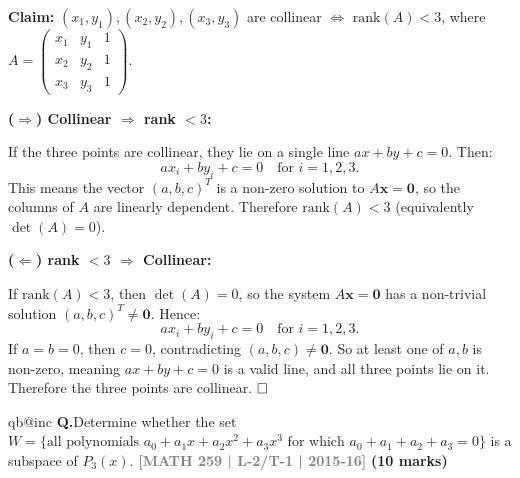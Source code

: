 \documentclass[12pt,a3paper]{article}
\makeatletter
\newcommand{\yr}[1]{\hfill\textcolor{gray}{\small\textbf{[#1]}}}
\newcommand{\mk}[1]{\textcolor{orange!70!black}{\small\textbf{(#1 marks)}}}
\newcounter{qnum}
\newcommand{\Q}[1]{%
  \csname qb@inc\endcsname
  \needspace{4\baselineskip}
  \refstepcounter{qnum}
  \vspace{6pt}
  \noindent\textbf{Q\theqnum.}\enspace #1\par
}
\makeatother
\begin{document}
\begin{tcolorbox}[enhanced,breakable,colback=cC!4,colframe=cC,
  boxrule=0.8pt,arc=5pt,
  title={\textbf{Answer}},
  fonttitle=\bfseries\color{white},colbacktitle=cC]

\textbf{Claim:} $(x_1,y_1),(x_2,y_2),(x_3,y_3)$ are collinear $\iff$ $\mathrm{rank}(A)<3$, where
$A=\begin{pmatrix}x_1&y_1&1\\x_2&y_2&1\\x_3&y_3&1\end{pmatrix}$.

\medskip
\textbf{($\Rightarrow$) Collinear $\Rightarrow$ rank $< 3$:}

If the three points are collinear, they lie on a single line $ax+by+c=0$.  Then:
\[
  ax_i + by_i + c = 0 \quad\text{for }i=1,2,3.
\]
This means the vector $(a,b,c)^T$ is a non-zero solution to $A\mathbf{x}=\mathbf{0}$, so the columns of $A$ are linearly dependent.  Therefore $\mathrm{rank}(A)<3$ (equivalently $\det(A)=0$).

\medskip
\textbf{($\Leftarrow$) rank $< 3$ $\Rightarrow$ Collinear:}

If $\mathrm{rank}(A)<3$, then $\det(A)=0$, so the system $A\mathbf{x}=\mathbf{0}$ has a non-trivial solution $(a,b,c)^T\neq\mathbf{0}$.  Hence:
\[
  ax_i + by_i + c = 0 \quad\text{for }i=1,2,3.
\]
If $a=b=0$, then $c=0$, contradicting $(a,b,c)\neq\mathbf{0}$.  So at least one of $a,b$ is non-zero, meaning $ax+by+c=0$ is a valid line, and all three points lie on it.  Therefore the three points are collinear. $\hfill\square$
\end{tcolorbox}

\Q{Determine whether the set $W = \{\text{all polynomials } a_0 + a_1 x + a_2 x^2 + a_3 x^3 \text{ for which } a_0 + a_1 + a_2 + a_3 = 0\}$ is a subspace of $P_3(x)$.
\yr{MATH 259 | L-2/T-1 | 2015-16} \mk{10}}
\end{document}
